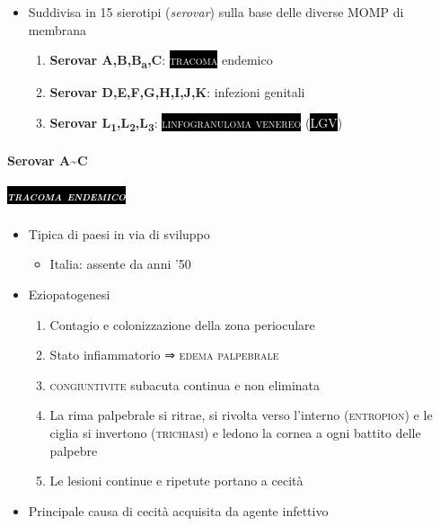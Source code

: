 \documentclass[italian,]{article}
\providecommand{\tightlist}{%
  \setlength{\itemsep}{0pt}\setlength{\parskip}{0pt}}
\newcommand{\pat}[1]{\colorbox{black}{\textcolor{white}{\textsc{#1}}}}
\begin{document}
\begin{itemize}
\tightlist
\item
  Suddivisa in 15 sierotipi (\emph{serovar}) sulla base delle diverse
  MOMP di membrana

  \begin{enumerate}
  \def\labelenumi{\arabic{enumi}.}
  \tightlist
  \item
    \textbf{Serovar A,B,B\textsubscript{a},C}: \pat{tracoma} endemico
  \item
    \textbf{Serovar D,E,F,G,H,I,J,K}: infezioni genitali
  \item
    \textbf{Serovar
    L\textsubscript{1},L\textsubscript{2},L\textsubscript{3}}:
    \pat{linfogranuloma venereo} (\pat{LGV})
  \end{enumerate}
\end{itemize}

\hypertarget{serovar-ac}{%
\paragraph{Serovar A\textasciitilde{}C}\label{serovar-ac}}

\hypertarget{section-7}{%
\subparagraph{\texorpdfstring{\pat{tracoma endemico}}{}}\label{section-7}}

\begin{itemize}
\tightlist
\item
  Tipica di paesi in via di sviluppo

  \begin{itemize}
  \tightlist
  \item
    Italia: assente da anni '50
  \end{itemize}
\item
  Eziopatogenesi

  \begin{enumerate}
  \def\labelenumi{\arabic{enumi}.}
  \setcounter{enumi}{-1}
  \tightlist
  \item
    Contagio e colonizzazione della zona perioculare
  \item
    Stato infiammatorio ⇒ \textsc{edema palpebrale}
  \item
    \textsc{congiuntivite} subacuta continua e non eliminata
  \item
    La rima palpebrale si ritrae, si rivolta verso l'interno
    (\textsc{entropion}) e le ciglia si invertono (\textsc{trichiasi}) e
    ledono la cornea a ogni battito delle palpebre
  \item
    Le lesioni continue e ripetute portano a cecità
  \end{enumerate}
\item
  Principale causa di cecità acquisita da agente infettivo
\end{itemize}
\end{document}
